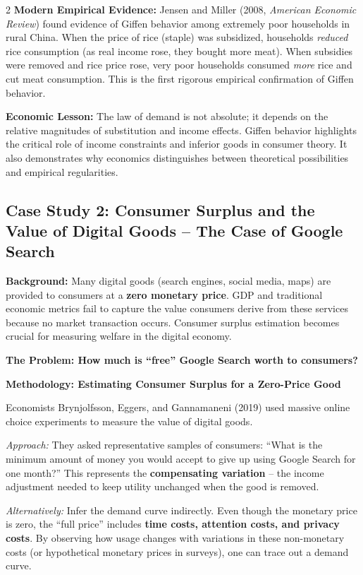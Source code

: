 \documentclass[10pt,a4paper]{article}
\begin{document}
\begin{multicols}{2}
\textbf{Modern Empirical Evidence:} Jensen and Miller (2008, \textit{American Economic Review}) found evidence of Giffen behavior among extremely poor households in rural China. When the price of rice (staple) was subsidized, households \textit{reduced} rice consumption (as real income rose, they bought more meat). When subsidies were removed and rice price rose, very poor households consumed \textit{more} rice and cut meat consumption. This is the first rigorous empirical confirmation of Giffen behavior.

\textbf{Economic Lesson:} The law of demand is not absolute; it depends on the relative magnitudes of substitution and income effects. Giffen behavior highlights the critical role of income constraints and inferior goods in consumer theory. It also demonstrates why economics distinguishes between theoretical possibilities and empirical regularities.

\subsection*{Case Study 2: Consumer Surplus and the Value of Digital Goods – The Case of Google Search}

\textbf{Background:} Many digital goods (search engines, social media, maps) are provided to consumers at a \textbf{zero monetary price}. GDP and traditional economic metrics fail to capture the value consumers derive from these services because no market transaction occurs. Consumer surplus estimation becomes crucial for measuring welfare in the digital economy.

\textbf{The Problem: How much is ``free'' Google Search worth to consumers?}

\textbf{Methodology: Estimating Consumer Surplus for a Zero-Price Good}

Economists Brynjolfsson, Eggers, and Gannamaneni (2019) used massive online choice experiments to measure the value of digital goods.

\textit{Approach:} They asked representative samples of consumers: ``What is the minimum amount of money you would accept to give up using Google Search for one month?'' This represents the \textbf{compensating variation} -- the income adjustment needed to keep utility unchanged when the good is removed.

\textit{Alternatively:} Infer the demand curve indirectly. Even though the monetary price is zero, the ``full price'' includes \textbf{time costs, attention costs, and privacy costs}. By observing how usage changes with variations in these non-monetary costs (or hypothetical monetary prices in surveys), one can trace out a demand curve.


\end{multicols}
\end{document}
